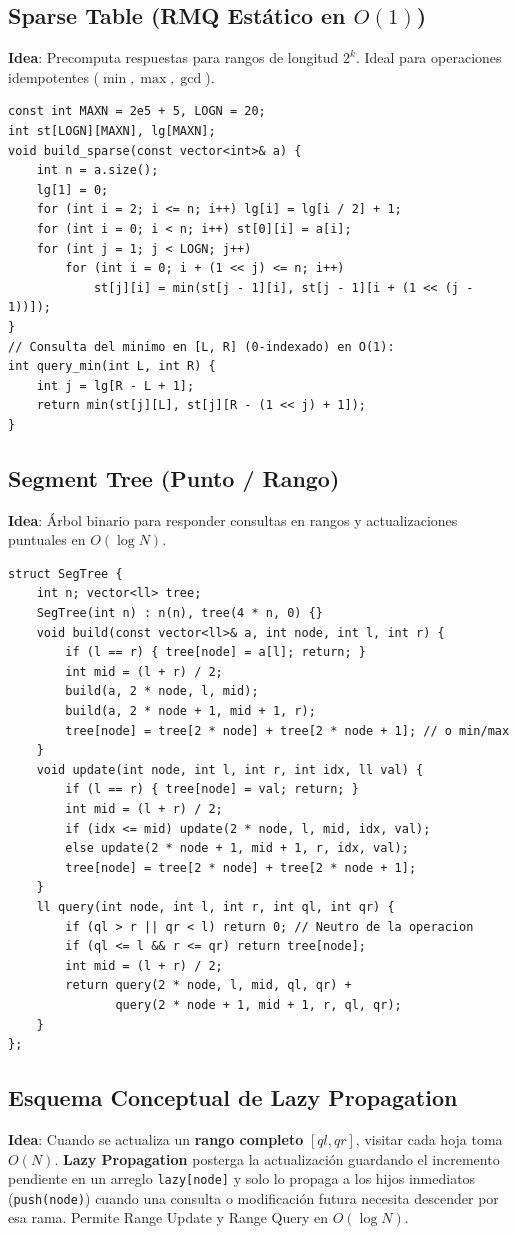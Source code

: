 \documentclass[9pt,twocolumn,a4paper]{extarticle}
\begin{document}
\subsection{Sparse Table (RMQ Estático en $O(1)$)}
\textbf{Idea}: Precomputa respuestas para rangos de longitud $2^k$. Ideal para operaciones idempotentes ($\min, \max, \gcd$).
\begin{lstlisting}
const int MAXN = 2e5 + 5, LOGN = 20;
int st[LOGN][MAXN], lg[MAXN];
void build_sparse(const vector<int>& a) {
    int n = a.size();
    lg[1] = 0;
    for (int i = 2; i <= n; i++) lg[i] = lg[i / 2] + 1;
    for (int i = 0; i < n; i++) st[0][i] = a[i];
    for (int j = 1; j < LOGN; j++)
        for (int i = 0; i + (1 << j) <= n; i++)
            st[j][i] = min(st[j - 1][i], st[j - 1][i + (1 << (j - 1))]);
}
// Consulta del minimo en [L, R] (0-indexado) en O(1):
int query_min(int L, int R) {
    int j = lg[R - L + 1];
    return min(st[j][L], st[j][R - (1 << j) + 1]);
}
\end{lstlisting}

\subsection{Segment Tree (Punto / Rango)}
\textbf{Idea}: Árbol binario para responder consultas en rangos y actualizaciones puntuales en $O(\log N)$.
\begin{lstlisting}
struct SegTree {
    int n; vector<ll> tree;
    SegTree(int n) : n(n), tree(4 * n, 0) {}
    void build(const vector<ll>& a, int node, int l, int r) {
        if (l == r) { tree[node] = a[l]; return; }
        int mid = (l + r) / 2;
        build(a, 2 * node, l, mid);
        build(a, 2 * node + 1, mid + 1, r);
        tree[node] = tree[2 * node] + tree[2 * node + 1]; // o min/max
    }
    void update(int node, int l, int r, int idx, ll val) {
        if (l == r) { tree[node] = val; return; }
        int mid = (l + r) / 2;
        if (idx <= mid) update(2 * node, l, mid, idx, val);
        else update(2 * node + 1, mid + 1, r, idx, val);
        tree[node] = tree[2 * node] + tree[2 * node + 1];
    }
    ll query(int node, int l, int r, int ql, int qr) {
        if (ql > r || qr < l) return 0; // Neutro de la operacion
        if (ql <= l && r <= qr) return tree[node];
        int mid = (l + r) / 2;
        return query(2 * node, l, mid, ql, qr) +
               query(2 * node + 1, mid + 1, r, ql, qr);
    }
};
\end{lstlisting}

\subsection{Esquema Conceptual de Lazy Propagation}
\textbf{Idea}: Cuando se actualiza un \textbf{rango completo} $[ql, qr]$, visitar cada hoja toma $O(N)$. \textbf{Lazy Propagation} posterga la actualización guardando el incremento pendiente en un arreglo \texttt{lazy[node]} y solo lo propaga a los hijos inmediatos (\texttt{push(node)}) cuando una consulta o modificación futura necesita descender por esa rama. Permite Range Update y Range Query en $O(\log N)$.
\end{document}
